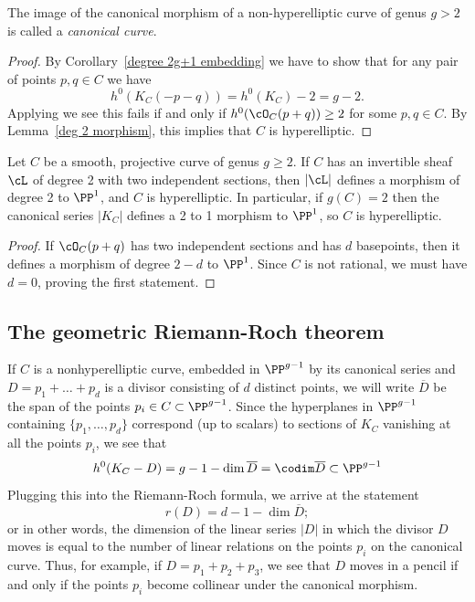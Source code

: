 The image of the canonical morphism of a non-hyperelliptic curve of genus $g>2$ is called a \emph{canonical curve}.

\begin{proof}
By Corollary~\ref{degree 2g+1 embedding} we have to show that for any pair of points $p, q \in C$ we have
$$
h^0(K_C(-p-q)) = h^0(K_C)-2 = g-2.
$$
Applying \trr we see this fails if and only if $h^0(\cO_C(p+q)) \geq 2$ for some $p,q \in C$. By Lemma~\ref{deg 2 morphism}, this implies that $C$ is hyperelliptic.
\end{proof}

\begin{lemma}\label{deg 2 morphism}
Let $C$ be a smooth, projective curve of genus $g\geq 2$. If $C$ has an invertible sheaf $\cL$ of degree 2 with two independent sections, then
$|\cL|$ defines a morphism of degree 2 to $\PP^{1}$, and $C$ is hyperelliptic. In particular, if $g(C) = 2$ then the canonical series $|K_{C}|$ defines a 2 to 1 morphism to $\PP^{1}$, so $C$ is hyperelliptic.
\end{lemma}

\begin{proof}
If $\cO_C(p+q)$ has two independent sections and has $d$ basepoints, then it defines a morphism of degree $2-d$ to $\PP^1$. Since $C$ is not rational,
we must have $d=0$, proving the first statement. 
\end{proof}

\subsection{The geometric Riemann-Roch theorem}

If $C$ is a nonhyperelliptic curve, embedded in $\PP^{g-1}$ by its canonical series and  $D = p_1+\dots + p_d$ is a divisor consisting of $d$ distinct points, we will write $\overline D$ be the span of the points $p_i \in C \subset \PP^{g-1}$. Since the hyperplanes in $\PP^{g-1}$ containing $\{p_1,\dots,p_d\}$ correspond (up to scalars) to sections of $K_C$ vanishing at all the points $p_i$, we see that
$$
h^0(K_C-D) = g - 1 - \dim \overline D = \codim \overline D \subset \PP^{g-1}
$$
Plugging this into the Riemann-Roch formula, we arrive at the statement
$$
r(D) = d - 1 - \dim \overline D;
$$
or in other words, the dimension of the linear series $|D|$ in which the divisor $D$ moves is equal to the number of linear relations on the points $p_i$ on the canonical curve. Thus, for example, if $D = p_1+p_2+p_3$, we see that $D$ moves in a pencil if and only if the points $p_i$ become collinear under the canonical morphism.


